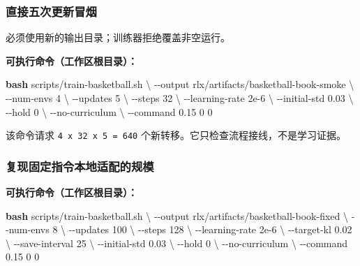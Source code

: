 \documentclass[
  chinese,
  11pt,
  letterpaper,
]{article}
\newenvironment{Shaded}{\begin{snugshade}}{\end{snugshade}}
\newcommand{\AttributeTok}[1]{\textcolor[rgb]{0.13,0.29,0.53}{#1}}
\newcommand{\DataTypeTok}[1]{\textcolor[rgb]{0.13,0.29,0.53}{#1}}
\newcommand{\FunctionTok}[1]{\textcolor[rgb]{0.13,0.29,0.53}{\textbf{#1}}}
\newcommand{\NormalTok}[1]{#1}
\renewenvironment{Shaded}{\par\smallskip}{\par\smallskip}
\begin{document}
\subsubsection{直接五次更新冒烟}\label{ux76f4ux63a5ux4e94ux6b21ux66f4ux65b0ux5192ux70df}

必须使用新的输出目录；训练器拒绝覆盖非空运行。

\textbf{可执行命令（工作区根目录）：}

\begin{Shaded}
\begin{Highlighting}[]
\FunctionTok{bash}\NormalTok{ scripts/train{-}basketball.sh }\DataTypeTok{\textbackslash{}}
  \AttributeTok{{-}{-}output}\NormalTok{ rlx/artifacts/basketball{-}book{-}smoke }\DataTypeTok{\textbackslash{}}
  \AttributeTok{{-}{-}num{-}envs}\NormalTok{ 4 }\DataTypeTok{\textbackslash{}}
  \AttributeTok{{-}{-}updates}\NormalTok{ 5 }\DataTypeTok{\textbackslash{}}
  \AttributeTok{{-}{-}steps}\NormalTok{ 32 }\DataTypeTok{\textbackslash{}}
  \AttributeTok{{-}{-}learning{-}rate}\NormalTok{ 2e{-}6 }\DataTypeTok{\textbackslash{}}
  \AttributeTok{{-}{-}initial{-}std}\NormalTok{ 0.03 }\DataTypeTok{\textbackslash{}}
  \AttributeTok{{-}{-}hold}\NormalTok{ 0 }\DataTypeTok{\textbackslash{}}
  \AttributeTok{{-}{-}no{-}curriculum} \DataTypeTok{\textbackslash{}}
  \AttributeTok{{-}{-}command}\NormalTok{ 0.15 0 0}
\end{Highlighting}
\end{Shaded}

该命令请求 \texttt{4\ x\ 32\ x\ 5\ =\ 640}
个新转移。它只检查流程接线，不是学习证据。

\subsubsection{复现固定指令本地适配的规模}\label{ux590dux73b0ux56faux5b9aux6307ux4ee4ux672cux5730ux9002ux914dux7684ux89c4ux6a21}

\textbf{可执行命令（工作区根目录）：}

\begin{Shaded}
\begin{Highlighting}[]
\FunctionTok{bash}\NormalTok{ scripts/train{-}basketball.sh }\DataTypeTok{\textbackslash{}}
  \AttributeTok{{-}{-}output}\NormalTok{ rlx/artifacts/basketball{-}book{-}fixed }\DataTypeTok{\textbackslash{}}
  \AttributeTok{{-}{-}num{-}envs}\NormalTok{ 8 }\DataTypeTok{\textbackslash{}}
  \AttributeTok{{-}{-}updates}\NormalTok{ 100 }\DataTypeTok{\textbackslash{}}
  \AttributeTok{{-}{-}steps}\NormalTok{ 128 }\DataTypeTok{\textbackslash{}}
  \AttributeTok{{-}{-}learning{-}rate}\NormalTok{ 2e{-}6 }\DataTypeTok{\textbackslash{}}
  \AttributeTok{{-}{-}target{-}kl}\NormalTok{ 0.02 }\DataTypeTok{\textbackslash{}}
  \AttributeTok{{-}{-}save{-}interval}\NormalTok{ 25 }\DataTypeTok{\textbackslash{}}
  \AttributeTok{{-}{-}initial{-}std}\NormalTok{ 0.03 }\DataTypeTok{\textbackslash{}}
  \AttributeTok{{-}{-}hold}\NormalTok{ 0 }\DataTypeTok{\textbackslash{}}
  \AttributeTok{{-}{-}no{-}curriculum} \DataTypeTok{\textbackslash{}}
  \AttributeTok{{-}{-}command}\NormalTok{ 0.15 0 0}
\end{Highlighting}
\end{Shaded}
\end{document}
